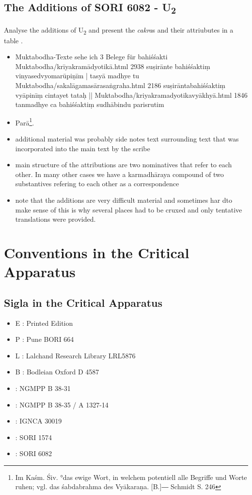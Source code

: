 {\section{The Additions of  SORI 6082 - U\textsubscript{2}}
\label{discussionu2}
Analyse the additions of U\textsubscript{2} and present the \textit{cakra}s and their attriubutes in a table .
\begin{itemize}
\item  Muktabodha-Texte sehe ich 3 Belege für bahiśśakti Muktabodha/krīyakramādyotikā.html 2938 suṣirānte bahiśśaktiṃ vinyasedvyomarūpiṇīm | tasyā madhye tu Muktabodha/sakalāgamasārasaṅgraha.html 2186 suṣirāntabahiśśaktiṃ vyāpinīṃ cintayet tataḥ || Muktabodha/kriyakramadyotikavyākhyā.html 1846 tanmadhye ca bahiśśaktiṃ sudhābindu parisrutim
\item  Parā\footnote{Im Kaśm. Śiv. °das ewige Wort, in welchem potentiell alle Begriffe und Worte ruhen; vgl. das śabdabrahma des Vyākaraṇa. [B.]― Schmidt S. 246}.
\item additional material was probably side notes text surrounding text that was incorporated into the main text by the scribe
\item main structure of the attributions are two nominatives that refer to each other. In many other cases we have a karmadhāraya compound of two substantives refering to each other as a correspondence
  \item note that the additions are very difficult material and sometimes har dto make sense of this is why several places had to be cruxed and only tentative translations were provided. 
  \end{itemize}

\chapter{Conventions in the Critical Apparatus}
\section{Sigla in the Critical Apparatus}

\begin{itemize}
\item E : Printed Edition
\item P : Pune BORI 664
\item L : Lalchand Research Library LRL5876
\item B : Bodleian Oxford D 4587
\item \None : NGMPP B 38-31
\item \Ntwo : NGMPP B 38-35 / A 1327-14
\item \Done : IGNCA 30019
\item \Uone : SORI 1574
\item \Utwo: SORI 6082
\end{itemize}

}
